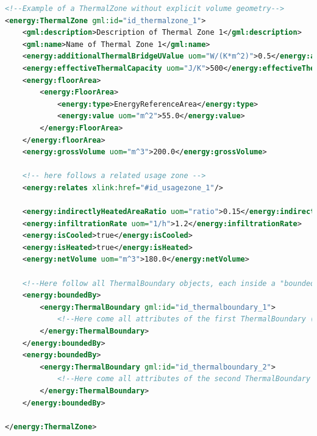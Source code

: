 \documentclass[a4paper,12pt]{article}
\begin{document}
\begin{lstlisting}[language=XML]
<!--Example of a ThermalZone without explicit volume geometry-->
<energy:ThermalZone gml:id="id_thermalzone_1">
    <gml:description>Description of Thermal Zone 1</gml:description>
    <gml:name>Name of Thermal Zone 1</gml:name>
    <energy:additionalThermalBridgeUValue uom="W/(K*m^2)">0.5</energy:additionalThermalBridgeUValue>
    <energy:effectiveThermalCapacity uom="J/K">500</energy:effectiveThermalCapacity>
    <energy:floorArea>
        <energy:FloorArea>
            <energy:type>EnergyReferenceArea</energy:type>
            <energy:value uom="m^2">55.0</energy:value>
        </energy:FloorArea>
    </energy:floorArea>
    <energy:grossVolume uom="m^3">200.0</energy:grossVolume>

    <!-- here follows a related usage zone -->
    <energy:relates xlink:href="#id_usagezone_1"/>

    <energy:indirectlyHeatedAreaRatio uom="ratio">0.15</energy:indirectlyHeatedAreaRatio>
    <energy:infiltrationRate uom="1/h">1.2</energy:infiltrationRate>
    <energy:isCooled>true</energy:isCooled>
    <energy:isHeated>true</energy:isHeated>
    <energy:netVolume uom="m^3">180.0</energy:netVolume>

    <!--Here follow all ThermalBoundary objects, each inside a "boundedBy" tag-->
    <energy:boundedBy>
        <energy:ThermalBoundary gml:id="id_thermalboundary_1">
            <!--Here come all attributes of the first ThermalBoundary (omitted here)-->
        </energy:ThermalBoundary>
    </energy:boundedBy>
    <energy:boundedBy>
        <energy:ThermalBoundary gml:id="id_thermalboundary_2">
            <!--Here come all attributes of the second ThermalBoundary (omitted here)-->
        </energy:ThermalBoundary>
    </energy:boundedBy>

</energy:ThermalZone>
\end{lstlisting}
\end{document}
